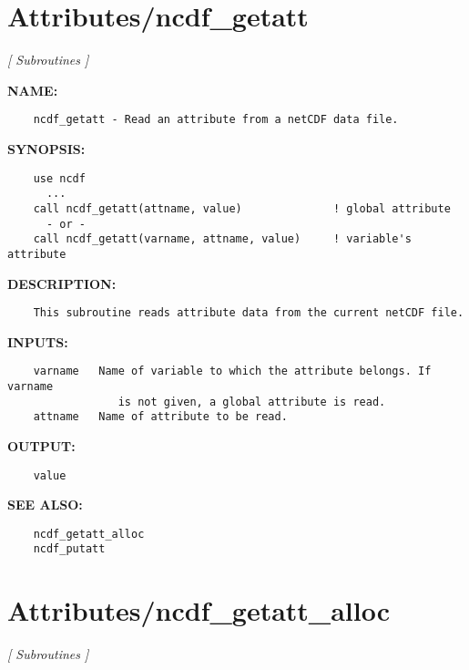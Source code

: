 \section{Attributes/ncdf\_getatt}
\textsl{[ Subroutines ]}

\label{ch:robo0}
\label{ch:Attributes_ncdf_getatt}
\textbf{NAME:}\hspace{0.08in}\begin{Verbatim}
    ncdf_getatt - Read an attribute from a netCDF data file.
\end{Verbatim}
\textbf{SYNOPSIS:}\hspace{0.08in}\begin{Verbatim}
    use ncdf
      ...
    call ncdf_getatt(attname, value)              ! global attribute
      - or -
    call ncdf_getatt(varname, attname, value)     ! variable's attribute
\end{Verbatim}
\textbf{DESCRIPTION:}\hspace{0.08in}\begin{Verbatim}
    This subroutine reads attribute data from the current netCDF file.
\end{Verbatim}
\textbf{INPUTS:}\hspace{0.08in}\begin{Verbatim}
    varname   Name of variable to which the attribute belongs. If varname
                 is not given, a global attribute is read.
    attname   Name of attribute to be read.
\end{Verbatim}
\textbf{OUTPUT:}\hspace{0.08in}\begin{Verbatim}
    value
\end{Verbatim}
\textbf{SEE ALSO:}\hspace{0.08in}\begin{Verbatim}
    ncdf_getatt_alloc
    ncdf_putatt
\end{Verbatim}
\section{Attributes/ncdf\_getatt\_alloc}
\textsl{[ Subroutines ]}

